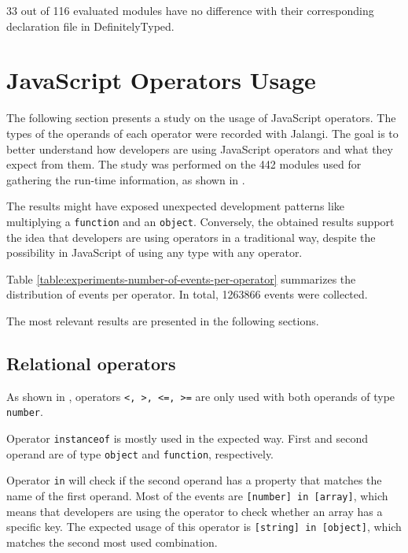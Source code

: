 33 out of 116 evaluated modules have no difference with their corresponding declaration file in DefinitelyTyped.



\section{JavaScript Operators Usage} \label{sec:experiments-js-operators-usage}
The following section presents a study on the usage of JavaScript operators. The types of the operands of each operator were recorded with Jalangi. The goal is to better understand how developers are using JavaScript operators and what they expect from them. The study was performed on the 442 modules used for gathering the run-time information, as shown in .

The results might have exposed unexpected development patterns like multiplying a \texttt{function} and an \texttt{object}. Conversely, the obtained results support the idea that developers are using operators in a traditional way, despite the possibility in JavaScript of using any type with any operator. 

Table \ref{table:experiments-number-of-events-per-operator} summarizes the distribution of events per operator. In total, 1263866 events were collected.

The most relevant results are presented in the following sections.



\subsection{Relational operators}
As shown in , operators \texttt{<, >, <=, >=} are only used with both operands of type \texttt{number}.

Operator \texttt{instanceof} is mostly used in the expected way. First and second operand are of type \texttt{object} and \texttt{function}, respectively.

Operator \texttt{in} will check if the second operand has a property that matches the name of the first operand. Most of the events are \texttt{[number] in [array]}, which means that developers are using the operator to check whether an array has a specific key. The expected usage of this operator is \texttt{[string] in [object]}, which matches the second most used combination.

